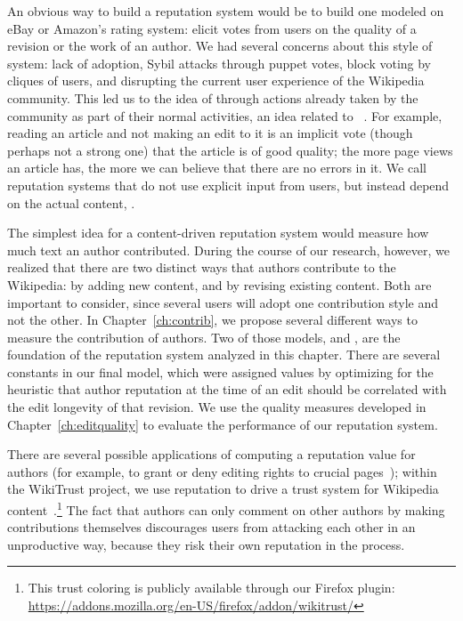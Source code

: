 An obvious way to build a reputation system would be to build one
modeled on eBay or Amazon's rating system: elicit votes from users
on the quality of a revision or the work of an author.
We had several concerns about this style of system: lack of adoption,
Sybil attacks through puppet votes, block voting by cliques of users, and
disrupting the current user experience of the Wikipedia community.
This led us to the idea of  through
actions already taken by the community as part of their normal activities,
an idea related to ~\cite{Samuelson1938}.
For example, reading an article and not making an edit to it is
an implicit vote (though perhaps not a strong one)
that the article is of good quality; the more page views an article
has, the more we can believe that there are no errors in it.
We call reputation systems that do not use explicit input
from users, but instead depend on the actual content, .


The simplest idea for a content-driven reputation system would measure
how much text an author contributed.
During the course of our research, however, we realized that there are
two distinct ways that authors contribute to the Wikipedia: by adding
new content, and by revising existing content.
Both are important to consider, since several users will
adopt one contribution style and not the other.
In Chapter~\ref{ch:contrib}, we propose several different ways
to measure the contribution of authors.
Two of those models, \tenrevs and \editlong,
are the foundation of the reputation system analyzed
in this chapter.
There are several constants in our final model, which were assigned
values by optimizing for the heuristic that author reputation at
the time of an edit
should be correlated with the edit longevity of that revision.
We use the quality measures developed in Chapter~\ref{ch:editquality}
to evaluate the performance of our reputation system.

\begin{comment}
We introduce in Chapter~\ref{ch:editquality} the notions of
\intro{text longevity}, which describes how added text survives
into later revisions, and \intro{edit longevity}, which measures
how consistent an edit is with later revisions,
to account for these different methods of contribution.
We use the principle that every future author is
implicitly making an evaluation on the work of past authors:
edits and new text that are preserved with later revisions
are judged ``good'' by the community.
\end{comment}


There are several possible applications of computing a reputation
value for authors (for example, to grant or deny editing rights to
crucial pages~\cite{Blaze1996}); within the WikiTrust project,
we use reputation to drive a trust system for
Wikipedia content~\cite{Adler2008b}.\footnote{This trust coloring
is publicly available through our Firefox plugin:
\url{https://addons.mozilla.org/en-US/firefox/addon/wikitrust/}}
The fact that authors can only comment on other authors by
making contributions themselves discourages users from attacking
each other in an unproductive way, because they risk their own reputation in the process.

